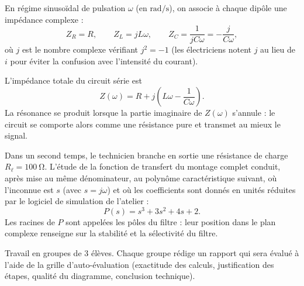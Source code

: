 \documentclass[11pt]{article}
\newcommand{\cle}[1]{{\popxbold\color{popdark}#1}}
\newcounter{popsec}
\newcounter{popsub}
\newcommand{\courssub}[1]{%
  \stepcounter{popsub}%
  \par\vspace{9pt}\noindent{\popxbold\fontsize{11.5}{13}\selectfont\color{popink}{\color{poporange}\thepopsec.\thepopsub}\hspace{6pt}#1}\par\nopagebreak\vspace{4pt}
}
\begin{document}
En régime sinusoïdal de pulsation $\omega$ (en $\si{\radian\per\second}$), on associe à chaque dipôle une \cle{impédance complexe} :
\[ Z_R = R, \qquad Z_L = jL\omega, \qquad Z_C = \frac{1}{jC\omega} = -\frac{j}{C\omega}, \]
où $j$ est le nombre complexe vérifiant $j^2 = -1$ (les électriciens notent $j$ au lieu de $i$ pour éviter la confusion avec l'intensité du courant).

L'impédance totale du circuit série est
\[ Z(\omega) = R + j\left(L\omega - \frac{1}{C\omega}\right). \]
La \cle{résonance} se produit lorsque la partie imaginaire de $Z(\omega)$ s'annule : le circuit se comporte alors comme une résistance pure et transmet au mieux le signal.

Dans un second temps, le technicien branche en sortie une résistance de charge $R_\ell = \SI{100}{\ohm}$. L'étude de la fonction de transfert du montage complet conduit, après mise au même dénominateur, au \cle{polynôme caractéristique} suivant, où l'inconnue est $s$ (avec $s = j\omega$) et où les coefficients sont donnés en unités réduites par le logiciel de simulation de l'atelier :
\[ P(s) = s^3 + 3s^2 + 4s + 2. \]
Les racines de $P$ sont appelées les \cle{pôles} du filtre : leur position dans le plan complexe renseigne sur la stabilité et la sélectivité du filtre.

\courssub{Consignes}

Travail en groupes de 3 élèves. Chaque groupe rédige un rapport qui sera évalué à l'aide de la grille d'auto-évaluation (exactitude des calculs, justification des étapes, qualité du diagramme, conclusion technique).
\end{document}
